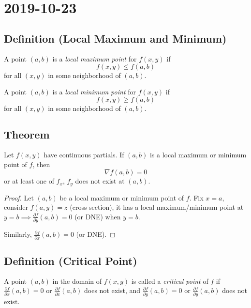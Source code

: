 \section{2019-10-23}
\begin{defbox}
    \subsection{Definition (Local Maximum and Minimum)}
    A point $ (a,b) $ is a \emph{local maximum point} for $ f(x,y) $ if
    \[ f(x,y)\le f(a,b) \]
    for all $ (x,y) $ in some neighborhood of $ (a,b) $.

    A point $ (a,b) $ is a \emph{local minimum point} for $ f(x,y) $ if
    \[ f(x,y)\ge f(a,b) \]
    for all $ (x,y) $ in some neighborhood of $ (a,b) $.
\end{defbox}

\begin{thmbox}
    \subsection{Theorem}
    Let $ f(x,y) $ have continuous partials. If $ (a,b) $ is a local
    maximum or minimum point of $ f $, then
    \[ \nabla f(a,b)=0 \]
    or at least one of $ f_x $, $ f_y $ does not exist at $ (a,b) $.
\end{thmbox}

\begin{proof}
    Let $ (a,b) $ be a local maximum or minimum point of $ f $. Fix
    $ x=a $, consider $ f(a,y)=z $ (cross section), it has a local
    maximum/minimum point at 
    $ y=b \implies \frac{\partial f}{\partial y}(a,b)=0 $ (or DNE) when $ y=b $.

    Similarly, $ \frac{\partial f}{\partial x}(a,b)=0 $ (or DNE).
\end{proof}

\begin{defbox}
    \subsection{Definition (Critical Point)}
    A point $ (a,b) $ in the domain of $ f(x,y) $ is called a 
    \emph{critical point} of $ f $ if $ \frac{\partial f}{\partial x}(a,b)=0 $
    or $ \frac{\partial f}{\partial x}(a,b) $ does not exist, and
    $ \frac{\partial f}{\partial y}(a,b)=0 $
    or $ \frac{\partial f}{\partial y}(a,b) $ does not exist.
\end{defbox}


